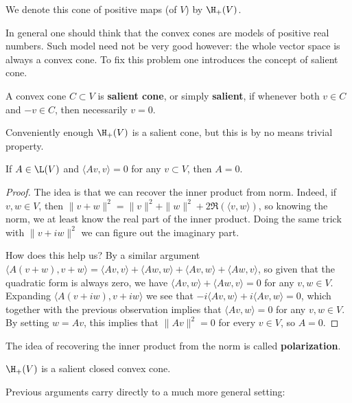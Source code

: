 We denote this cone of positive maps (of $V$) by $\H_{+}(V)$.

In general one should think that the convex cones are models of positive real numbers. Such model need not be very good however: the whole vector space is always a convex cone. To fix this problem one introduces the concept of salient cone.

\begin{maar}
	A convex cone $C \subset V$ is \textbf{salient cone}, or simply \textbf{salient}, if whenever both $v \in C$ and $-v \in C$, then necessarily $v = 0$.
\end{maar}

Conveniently enough $\H_{+}(V)$ is a salient cone, but this is by no means trivial property.

\begin{lem}\label{inj_compr}
	If $A \in \L(V)$ and $\langle A v, v \rangle = 0$ for any $v \subset V$, then $A = 0$.
\end{lem} 
\begin{proof}
	The idea is that we can recover the inner product from norm. Indeed, if $v, w \in V$, then $\|v + w\|^2 = \|v\|^2 + \|w\|^2 + 2 \Re(\langle v, w \rangle)$, so knowing the norm, we at least know the real part of the inner product. Doing the same trick with $\|v + i w\|^2$ we can figure out the imaginary part.

	How does this help us? By a similar argument $\langle A(v + w), v + w \rangle = \langle A v, v \rangle + \langle A w, w \rangle + \langle A v, w\rangle + \langle A w, v \rangle$, so given that the quadratic form is always zero, we have $\langle A v, w \rangle + \langle A w, v \rangle = 0$ for any $v, w \in V$. Expanding $\langle A (v + i w), v + i w \rangle$ we see that $-i \langle A v, w \rangle + i \langle A v, w \rangle = 0$, which together with the previous observation implies that $\langle A v , w \rangle = 0$ for any $v, w \in V$. By setting $w = A v$, this implies that $\|A v\|^{2} = 0$ for every $v \in V$, so $A = 0$.
\end{proof}

The idea of recovering the inner product from the norm is called \textbf{polarization}.

\begin{kor}\label{basic_positive}
	$\H_{+}(V)$ is a salient closed convex cone.
\end{kor}

Previous arguments carry directly to a much more general setting:

